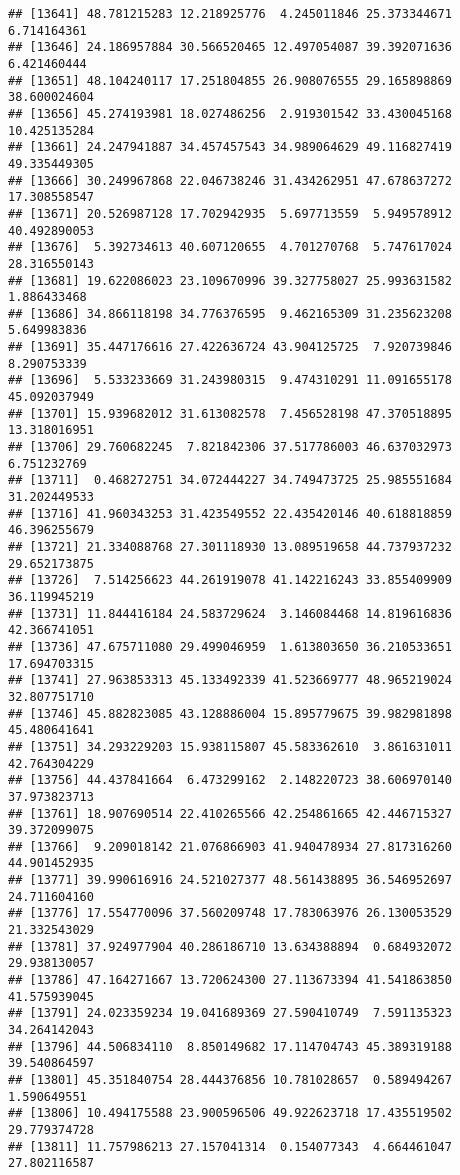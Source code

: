 \documentclass[
]{article}
\begin{document}
\begin{verbatim}
## [13641] 48.781215283 12.218925776  4.245011846 25.373344671  6.714164361
## [13646] 24.186957884 30.566520465 12.497054087 39.392071636  6.421460444
## [13651] 48.104240117 17.251804855 26.908076555 29.165898869 38.600024604
## [13656] 45.274193981 18.027486256  2.919301542 33.430045168 10.425135284
## [13661] 24.247941887 34.457457543 34.989064629 49.116827419 49.335449305
## [13666] 30.249967868 22.046738246 31.434262951 47.678637272 17.308558547
## [13671] 20.526987128 17.702942935  5.697713559  5.949578912 40.492890053
## [13676]  5.392734613 40.607120655  4.701270768  5.747617024 28.316550143
## [13681] 19.622086023 23.109670996 39.327758027 25.993631582  1.886433468
## [13686] 34.866118198 34.776376595  9.462165309 31.235623208  5.649983836
## [13691] 35.447176616 27.422636724 43.904125725  7.920739846  8.290753339
## [13696]  5.533233669 31.243980315  9.474310291 11.091655178 45.092037949
## [13701] 15.939682012 31.613082578  7.456528198 47.370518895 13.318016951
## [13706] 29.760682245  7.821842306 37.517786003 46.637032973  6.751232769
## [13711]  0.468272751 34.072444227 34.749473725 25.985551684 31.202449533
## [13716] 41.960343253 31.423549552 22.435420146 40.618818859 46.396255679
## [13721] 21.334088768 27.301118930 13.089519658 44.737937232 29.652173875
## [13726]  7.514256623 44.261919078 41.142216243 33.855409909 36.119945219
## [13731] 11.844416184 24.583729624  3.146084468 14.819616836 42.366741051
## [13736] 47.675711080 29.499046959  1.613803650 36.210533651 17.694703315
## [13741] 27.963853313 45.133492339 41.523669777 48.965219024 32.807751710
## [13746] 45.882823085 43.128886004 15.895779675 39.982981898 45.480641641
## [13751] 34.293229203 15.938115807 45.583362610  3.861631011 42.764304229
## [13756] 44.437841664  6.473299162  2.148220723 38.606970140 37.973823713
## [13761] 18.907690514 22.410265566 42.254861665 42.446715327 39.372099075
## [13766]  9.209018142 21.076866903 41.940478934 27.817316260 44.901452935
## [13771] 39.990616916 24.521027377 48.561438895 36.546952697 24.711604160
## [13776] 17.554770096 37.560209748 17.783063976 26.130053529 21.332543029
## [13781] 37.924977904 40.286186710 13.634388894  0.684932072 29.938130057
## [13786] 47.164271667 13.720624300 27.113673394 41.541863850 41.575939045
## [13791] 24.023359234 19.041689369 27.590410749  7.591135323 34.264142043
## [13796] 44.506834110  8.850149682 17.114704743 45.389319188 39.540864597
## [13801] 45.351840754 28.444376856 10.781028657  0.589494267  1.590649551
## [13806] 10.494175588 23.900596506 49.922623718 17.435519502 29.779374728
## [13811] 11.757986213 27.157041314  0.154077343  4.664461047 27.802116587

\end{verbatim}
\end{document}
